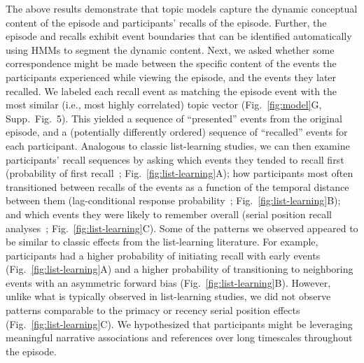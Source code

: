 \documentclass[10pt]{article}
\newcommand{\matchmats}{5}
\begin{document}
The above results demonstrate that topic models capture the dynamic conceptual content of the episode and participants' recalls of the episode.  Further, the episode and recalls exhibit event boundaries that can be identified automatically using HMMs to segment the dynamic content.  Next, we asked whether some correspondence might be made between the specific content of the events the participants experienced while viewing the episode, and the events they later recalled.  We labeled each recall event as matching the episode event with the most similar (i.e., most highly correlated) topic vector (Fig.~\ref{fig:model}G, Supp.\ Fig.~\matchmats).  This yielded a sequence of ``presented'' events from the original episode, and a (potentially differently ordered) sequence of ``recalled'' events for each participant.  Analogous to classic list-learning studies, we can then examine participants' recall sequences by asking which events they tended to recall first (probability of first recall~\citep{AtkiShif68, PostPhil65, WelcBurn24}; Fig.~\ref{fig:list-learning}A); how participants most often transitioned between recalls of the events as a function of the temporal distance between them (lag-conditional response probability~\citep{Kaha96}; Fig.~\ref{fig:list-learning}B); and which events they were likely to remember overall (serial position recall analyses~\citep{Murd62a}; Fig.~\ref{fig:list-learning}C). Some of the patterns we observed appeared to be similar to classic effects from the list-learning literature.  For example, participants had a higher probability of initiating recall with early events (Fig.~\ref{fig:list-learning}A) and a higher probability of transitioning to neighboring events with an asymmetric forward bias (Fig.~\ref{fig:list-learning}B). However, unlike what is typically observed in list-learning studies, we did not observe patterns comparable to the primacy or recency serial position effects (Fig.~\ref{fig:list-learning}C).  We hypothesized that participants might be leveraging meaningful narrative associations and references over long timescales throughout the episode.
\end{document}
